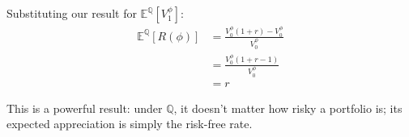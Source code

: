 Substituting our result for $\mathbb{E}^\mathbb{Q}[V_1^\phi]$:
\begin{align}
    \mathbb{E}^\mathbb{Q}[R(\phi)] &= \frac{V_0^\phi(1+r) - V_0^\phi}{V_0^\phi} \\
    &= \frac{V_0^\phi(1+r - 1)}{V_0^\phi} \\
    &= r
\end{align}

This is a powerful result: under $\mathbb{Q}$, it doesn't matter how risky a portfolio is; its expected appreciation is simply the risk-free rate.
